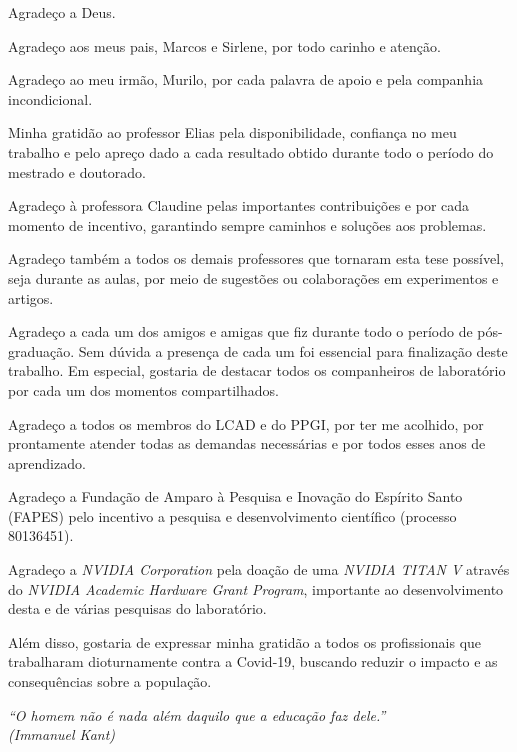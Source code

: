 \documentclass[
	12pt,				%
	openright,			%
	twoside,			%
	a4paper,			%
	english,			%
	french,				%
	spanish,			%
	brazil				%
	]{abntex2}
\begin{document}
\begin{agradecimentos}
Agradeço a Deus.

Agradeço aos meus pais, Marcos e Sirlene, por todo carinho e atenção.

Agradeço ao meu irmão, Murilo, por cada palavra de apoio e pela companhia incondicional.

Minha gratidão ao professor Elias pela disponibilidade, confiança no meu trabalho e pelo apreço dado a cada resultado obtido durante todo o período do mestrado e doutorado.

Agradeço à professora Claudine pelas importantes contribuições e por cada momento de incentivo, garantindo sempre caminhos e soluções aos problemas.

Agradeço também a todos os demais professores que tornaram esta tese possível, seja durante as aulas, por meio de sugestões ou colaborações em experimentos e artigos.

Agradeço a cada um dos amigos e amigas que fiz durante todo o período de pós-graduação. Sem dúvida a presença de cada um foi essencial para finalização deste trabalho. Em especial, gostaria de destacar todos os companheiros de laboratório por cada um dos momentos compartilhados.

Agradeço a todos os membros do LCAD e do PPGI, por ter me acolhido, por prontamente atender todas as demandas necessárias e por todos esses anos de aprendizado.

Agradeço a Fundação de Amparo à Pesquisa e Inovação do Espírito Santo (FAPES) pelo incentivo a pesquisa e desenvolvimento científico (processo 80136451).

Agradeço a \textit{NVIDIA Corporation} pela doação de uma \textit{NVIDIA TITAN V} através do \textit{NVIDIA Academic Hardware Grant Program}, importante ao desenvolvimento desta e de várias pesquisas do laboratório.

Além disso, gostaria de expressar minha gratidão a todos os profissionais que trabalharam dioturnamente contra a Covid-19, buscando reduzir o impacto e as consequências sobre a população.

\end{agradecimentos}


\begin{epigrafe}
    \vspace*{\fill}
	\begin{flushright}
		\textit{``O homem não é nada além daquilo que a educação faz dele.''\\
		(Immanuel Kant)}
	\end{flushright}
\end{epigrafe}
\end{document}
